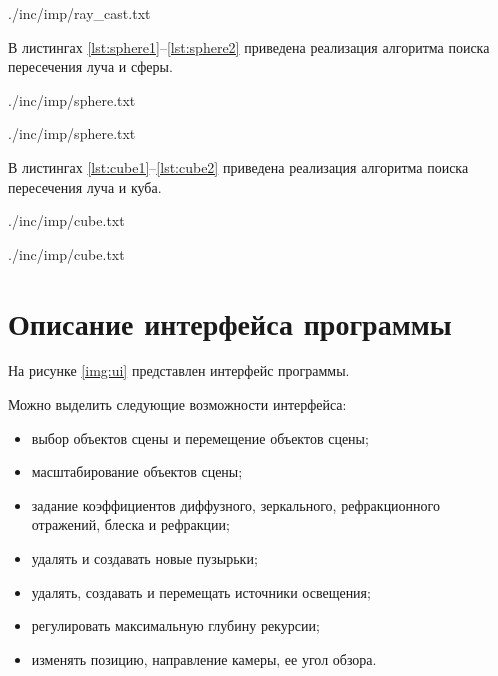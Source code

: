 \begin{lstinputlisting}[
	caption={Алгоритм пуска луча},
	label={lst:ray_cast},
	style={go},
	]{./inc/imp/ray_cast.txt}
\end{lstinputlisting}

В листингах \ref{lst:sphere1}--\ref{lst:sphere2} приведена реализация алгоритма поиска пересечения луча и сферы.

\begin{lstinputlisting}[
	caption={Алгоритм поиска пересечения луча и сферы (часть 1)},
	label={lst:sphere1},
	style={go},
	linerange={1-5},
	]{./inc/imp/sphere.txt}
\end{lstinputlisting}

\begin{lstinputlisting}[
	caption={Алгоритм поиска пересечения луча и сферы (часть 2)},
	label={lst:sphere2},
	style={go},
	linerange={6-17},
	]{./inc/imp/sphere.txt}
\end{lstinputlisting}

В листингах \ref{lst:cube1}--\ref{lst:cube2} приведена реализация алгоритма поиска пересечения луча и куба.

\begin{lstinputlisting}[
	caption={Алгоритм поиска пересечения луча и куба (часть 1)},
	label={lst:cube1},
	style={go},
	linerange={1-28},
	]{./inc/imp/cube.txt}
\end{lstinputlisting}

\newpage

\begin{lstinputlisting}[
	caption={Алгоритм поиска пересечения луча и куба (часть 2)},
	label={lst:cube2},
	style={go},
	linerange={29-36},
	]{./inc/imp/cube.txt}
\end{lstinputlisting}


\captionsetup{singlelinecheck = false, justification=centering}

\section{Описание интерфейса программы}

На рисунке \ref{img:ui} представлен интерфейс программы.

Можно выделить следующие возможности интерфейса:
\begin{itemize}
	\item выбор объектов сцены и перемещение объектов сцены;
	\item масштабирование объектов сцены;
	\item задание коэффициентов диффузного, зеркального, рефракционного отражений, блеска и рефракции;
	\item удалять и создавать новые пузырьки;
	\item удалять, создавать и перемещать источники освещения;
	\item регулировать максимальную глубину рекурсии;
	\item изменять позицию, направление камеры, ее угол обзора.
\end{itemize}

